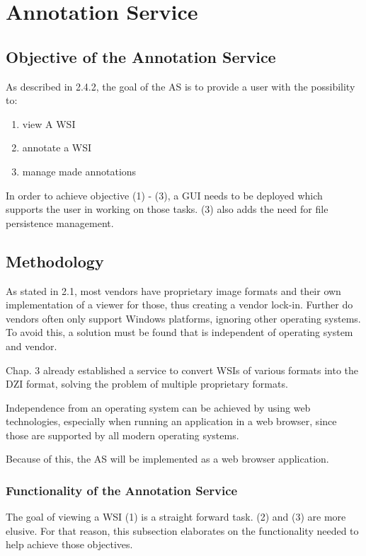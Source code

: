\chapter{Annotation Service}

\section{Objective of the Annotation Service}
As described in 2.4.2, the goal of the AS is to provide a user with the possibility to:
\begin{enumerate}[(1)]
	\item view A WSI
	\item annotate a WSI
	\item manage made annotations
\end{enumerate}

In order to achieve objective (1) - (3), a GUI needs to be deployed which supports the user in working on those tasks. (3) also adds the need for file persistence management.


\section{Methodology}
As stated in 2.1, most vendors have proprietary image formats and their own implementation of a viewer for those, thus creating a vendor lock-in. Further do vendors often only support Windows platforms, ignoring other operating systems\cite{Cornish13}\cite{DICOM10}\cite{Farahanil15}. To avoid this, a solution must be found that is independent of operating system and vendor.

Chap. 3 already established a service to convert WSIs of various formats into the DZI format, solving the problem of multiple proprietary formats. 

Independence from an operating system can be achieved by using web technologies, especially when running an application in a web browser\cite{Tseytlin14}, since those are supported by all modern operating systems. 

Because of this, the AS will be implemented as a web browser application. 


\subsection{Functionality of the Annotation Service}
The goal of viewing a WSI (1) is a straight forward task. (2) and (3) are more elusive. For that reason, this subsection elaborates on the functionality needed to help achieve those objectives.

